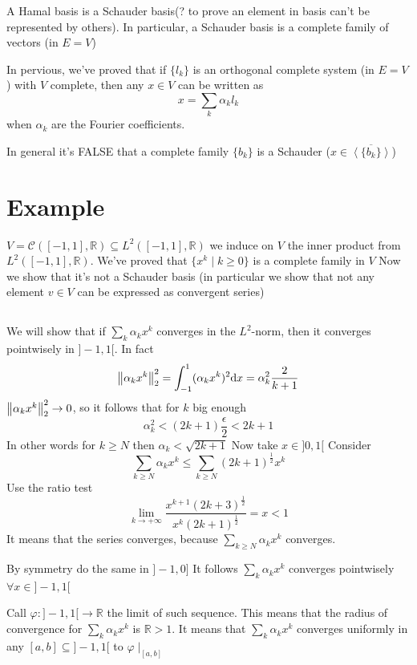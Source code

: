 \documentclass{book}
\newcommand{\leftbracket}{[}
\newcommand{\rightbracket}{]}
\begin{document}
A Hamal basis is a Schauder basis(? to prove an element in basis can't be represented by others). In particular, a Schauder basis is a complete family of vectors (in $E=V$)

In pervious, we've proved that if $\{l_k\}$ is an orthogonal complete system (in $E=V$) with $V$ complete, then any $x\in V$ can be written as$$x=\sum\limits_k\alpha_kl_k$$ when $\alpha_k$ are the Fourier coefficients.

In general it's FALSE that a complete family $\{b_k\}$ is a Schauder ($x\in \overline{\left<\{b_k\}\right>}$)
\section*{Example}
$V=\mathcal{C}([-1,1],\mathbb{R})\subseteq L^2([-1,1],\mathbb{R})$
we induce on $V$ the inner product from $L^2([-1,1],\mathbb{R})$. We've proved that $\{x^k\mid k\geq0\}$ is a complete family in $V$ Now we show that it's not a Schauder basis (in particular we show that not any element $v\in V$ can be expressed as convergent series)
\subsection{}
We will show that if $\sum\limits_k\alpha_kx^k$ converges in the $L^2$-norm, then it converges pointwisely in $\rightbracket-1,1\leftbracket$. In fact $$\left\lVert \alpha_kx^k \right\rVert_2^2=\int_{-1}^1(\alpha_kx^k)^2\text{d}x=\alpha_k^2\frac{2}{k+1}$$
$\left\lVert \alpha_kx^k \right\rVert_2^2\rightarrow 0$, so it follows that for $k$ big enough $$\alpha_k^2<(2k+1)\frac{\epsilon}2<2k+1$$
In other words for $k\geq N$ then $\alpha_k<\sqrt{2k+1}$
Now take $x\in \rightbracket 0,1\leftbracket$ Consider $$\sum\limits_{k\geq N}\alpha_kx^k\leq\sum\limits_{k\geq N}(2k+1)^{\frac{1}{2}}x^k$$
Use the ratio test$$\lim\limits_{k\rightarrow+\infty}\frac{x^{k+1}(2k+3)^{\frac{1}{2}}}{x^k(2k+1)^{\frac{1}{2}}}=x<1$$ It means that the series converges, because $\sum\limits_{k\geq N}\alpha_kx^k$ converges.

By symmetry do the same in $\rightbracket-1,0\rightbracket$ It follows $\sum\limits_k\alpha_kx^k$ converges pointwisely $\forall x\in \rightbracket-1,1\leftbracket$

Call $\varphi:\rightbracket-1,1\leftbracket\rightarrow \mathbb{R}$ the limit of such sequence. This means that the radius of convergence for $\sum\limits_k\alpha_kx^k$ is $\mathbb{R}>1$. It means that $\sum\limits_k\alpha_kx^k$  converges uniformly in any $[a,b]\subseteq\rightbracket-1,1\leftbracket$ to $\varphi\mid_{[a,b]}$
\end{document}
